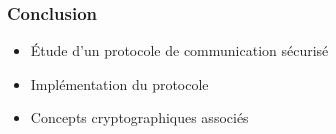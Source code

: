 \begin{frame}
\frametitle{Conclusion}
\begin{itemize}
\item Étude d'un protocole de communication sécurisé
\item Implémentation du protocole
\item Concepts cryptographiques associés
\end{itemize}
\end{frame}
